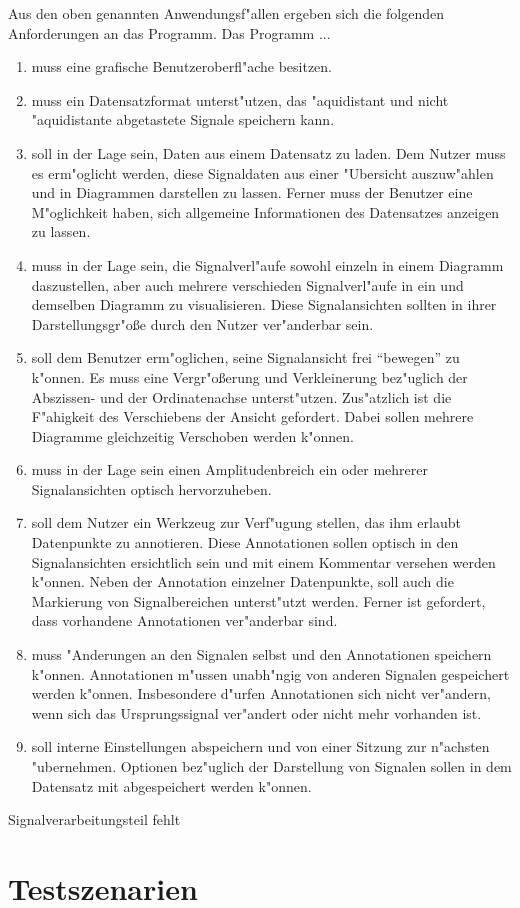 Aus den oben genannten Anwendungsf"allen ergeben sich die folgenden Anforderungen an das Programm.
Das Programm ...
\renewcommand{\theenumi}{\Alph{enumi}}
\renewcommand{\labelenumi}{\theenumi )}
\newcommand{\AF}[1]{\item \label{AF:#1}}
\begin{enumerate}
	\AF{gui} muss eine grafische Benutzeroberfl"ache besitzen.
	\AF{datensatz} muss ein Datensatzformat unterst"utzen, das "aquidistant und nicht "aquidistante abgetastete Signale speichern kann.
	\AF{datenmanagement} soll in der Lage sein, Daten aus einem Datensatz zu laden.
						 Dem Nutzer muss es erm"oglicht werden, diese Signaldaten aus einer "Ubersicht auszuw"ahlen und in Diagrammen darstellen zu lassen.
						 Ferner muss der Benutzer eine M"oglichkeit haben, sich allgemeine Informationen des Datensatzes anzeigen zu lassen.
	\AF{diagramm} muss in der Lage sein, die Signalverl"aufe sowohl einzeln in einem Diagramm daszustellen, aber auch mehrere verschieden Signalverl"aufe in ein und demselben Diagramm zu visualisieren.
				  Diese Signalansichten sollten in ihrer Darstellungsgr"o\ss e durch den Nutzer ver"anderbar sein.
	\AF{ansicht} soll dem Benutzer erm"oglichen, seine Signalansicht frei "`bewegen"' zu k"onnen.
				 Es muss eine Vergr"o\ss erung und Verkleinerung bez"uglich der Abszissen- und der Ordinatenachse unterst"utzen.
				 Zus"atzlich ist die F"ahigkeit des Verschiebens der Ansicht gefordert.
				 Dabei sollen mehrere Diagramme gleichzeitig Verschoben werden k"onnen.
	\AF{amplitudenmarkierung} muss in der Lage sein einen Amplitudenbreich ein oder mehrerer Signalansichten optisch hervorzuheben.
	\AF{annotationen} soll dem Nutzer ein Werkzeug zur Verf"ugung stellen, das ihm erlaubt Datenpunkte zu annotieren.
					  Diese Annotationen sollen optisch in den Signalansichten ersichtlich sein und mit einem Kommentar versehen werden k"onnen.
					  Neben der Annotation einzelner Datenpunkte, soll auch die Markierung von Signalbereichen unterst"utzt werden.
					  Ferner ist gefordert, dass vorhandene Annotationen ver"anderbar sind.
	\AF{io} muss "Anderungen an den Signalen selbst und den Annotationen speichern k"onnen.
			Annotationen m"ussen unabh"ngig von anderen Signalen gespeichert werden k"onnen.
			Insbesondere d"urfen Annotationen sich nicht ver"andern, wenn sich das Ursprungssignal ver"andert oder nicht mehr vorhanden ist.
	\AF{einstellungen} soll interne Einstellungen abspeichern und von einer Sitzung zur n"achsten "ubernehmen.
					   Optionen bez"uglich der Darstellung von Signalen sollen in dem Datensatz mit abgespeichert werden k"onnen.
\end{enumerate}

Signalverarbeitungsteil fehlt

\section{Testszenarien}


